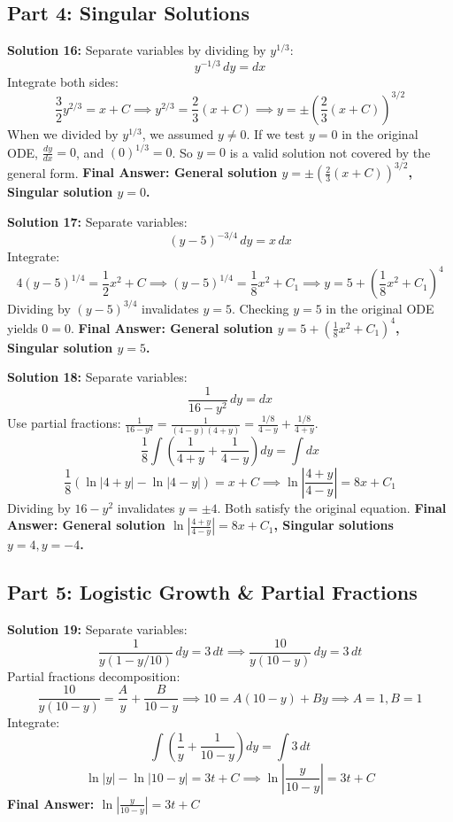 \documentclass[11pt]{article}
\begin{document}
\subsection*{Part 4: Singular Solutions}

\textbf{Solution 16:}
Separate variables by dividing by $y^{1/3}$:
\[ y^{-1/3} \, dy = dx \]
Integrate both sides:
\[ \frac{3}{2}y^{2/3} = x + C \implies y^{2/3} = \frac{2}{3}(x+C) \implies y = \pm\left(\frac{2}{3}(x+C)\right)^{3/2} \]
When we divided by $y^{1/3}$, we assumed $y \neq 0$. If we test $y=0$ in the original ODE, $\frac{dy}{dx} = 0$, and $(0)^{1/3} = 0$. So $y=0$ is a valid solution not covered by the general form.
\textbf{Final Answer: General solution $y = \pm\left(\frac{2}{3}(x+C)\right)^{3/2}$, Singular solution $y = 0$.}

\textbf{Solution 17:}
Separate variables:
\[ (y-5)^{-3/4} \, dy = x \, dx \]
Integrate:
\[ 4(y-5)^{1/4} = \frac{1}{2}x^2 + C \implies (y-5)^{1/4} = \frac{1}{8}x^2 + C_1 \implies y = 5 + \left(\frac{1}{8}x^2 + C_1\right)^4 \]
Dividing by $(y-5)^{3/4}$ invalidates $y=5$. Checking $y=5$ in the original ODE yields $0=0$.
\textbf{Final Answer: General solution $y = 5 + \left(\frac{1}{8}x^2 + C_1\right)^4$, Singular solution $y = 5$.}

\textbf{Solution 18:}
Separate variables:
\[ \frac{1}{16 - y^2} \, dy = dx \]
Use partial fractions: $\frac{1}{16-y^2} = \frac{1}{(4-y)(4+y)} = \frac{1/8}{4-y} + \frac{1/8}{4+y}$.
\[ \frac{1}{8} \int \left( \frac{1}{4+y} + \frac{1}{4-y} \right) dy = \int dx \]
\[ \frac{1}{8} \left( \ln|4+y| - \ln|4-y| \right) = x + C \implies \ln\left|\frac{4+y}{4-y}\right| = 8x + C_1 \]
Dividing by $16-y^2$ invalidates $y = \pm 4$. Both satisfy the original equation.
\textbf{Final Answer: General solution $\ln\left|\frac{4+y}{4-y}\right| = 8x + C_1$, Singular solutions $y = 4, y = -4$.}

\subsection*{Part 5: Logistic Growth \& Partial Fractions}

\textbf{Solution 19:}
Separate variables:
\[ \frac{1}{y(1 - y/10)} \, dy = 3 \, dt \implies \frac{10}{y(10 - y)} \, dy = 3 \, dt \]
Partial fractions decomposition:
\[ \frac{10}{y(10 - y)} = \frac{A}{y} + \frac{B}{10 - y} \implies 10 = A(10-y) + By \implies A=1, B=1 \]
Integrate:
\[ \int \left( \frac{1}{y} + \frac{1}{10 - y} \right) dy = \int 3 \, dt \]
\[ \ln|y| - \ln|10-y| = 3t + C \implies \ln\left|\frac{y}{10-y}\right| = 3t + C \]
\textbf{Final Answer: $\ln\left|\frac{y}{10-y}\right| = 3t + C$}
\end{document}
